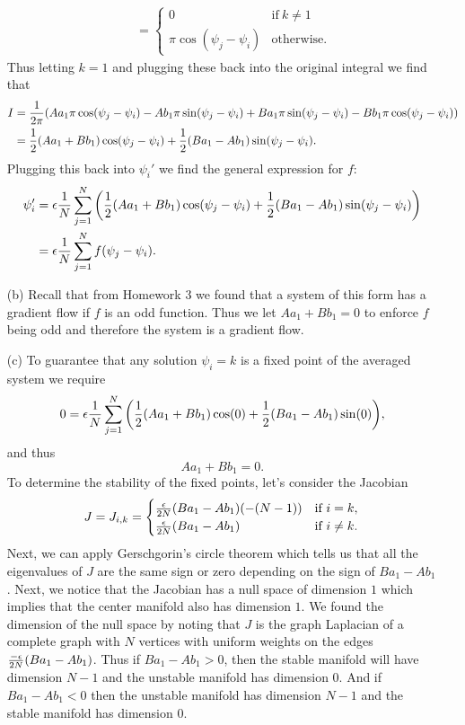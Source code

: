 \documentclass[12pt]{report}
\begin{document}
\begin{solution}
\begin{enumerate}
\begin{align*}
            &\quad = \begin{cases}
                0 & \text{if}~k\neq1\\
                \pi \cos(\psi_j - \psi_i) &\text{otherwise.}
            \end{cases}
        \end{align*}
        Thus letting $k=1$ and plugging these back into the original integral we find that
        \begin{align*}
            I &= \frac{1}{2\pi}{\left(Aa_1 \pi \cos(\psi_j - \psi_i) - Ab_1\pi \sin(\psi_j - \psi_i) + Ba_1\pi\sin(\psi_j - \psi_i) - Bb_1\pi \cos(\psi_j - \psi_i)\right)}\\
            &= \frac{1}{2}{\left(Aa_1 + Bb_1\right)}\cos(\psi_j - \psi_i) + \frac{1}{2}{\left(Ba_1 - Ab_1\right)}\sin(\psi_j - \psi_i).
        \end{align*}
        Plugging this back into $\psi_i'$ we find the general expression for $f$:
        \begin{align*}
            \psi_i' &= {\epsilon} \frac{1}{N}\sum_{j=1}^{N}{\left(\frac{1}{2}(Aa_1 + Bb_1)\cos(\psi_j - \psi_i) + \frac{1}{2}{\left(Ba_1 - Ab_1\right)}\sin(\psi_j - \psi_i)\right)}\\
            &= {\epsilon} \frac{1}{N}\sum_{j=1}^{N}f(\psi_j - \psi_i).
        \end{align*}


        \item [(b)]
        Recall that from Homework 3 we found that a system of this form has a gradient flow if $f$ is an odd function. Thus we let $Aa_1 + Bb_1 = 0$ to enforce $f$ being odd and therefore the system is a gradient flow.
        
        
        \item [(c)]
        To guarantee that any solution $\psi_i = k$ is a fixed point of the averaged system we require
        \[
            0 ={\epsilon} \frac{1}{N}\sum_{j=1}^{N}{\left(\frac{1}{2}(Aa_1 + Bb_1)\cos(0) + \frac{1}{2}{\left(Ba_1 - Ab_1\right)}\sin(0)\right)},
        \]
        and thus
        \[
            Aa_1 + Bb_1 = 0.
        \]
        To determine the stability of the fixed points, let's consider the Jacobian
        \[
            J = J_{i,k} = \begin{cases}
               \frac{{\epsilon}}{2N}(Ba_1 - Ab_1)(-(N-1)) &\text{if}~ i = k,\\
               \frac{{\epsilon}}{2N}(Ba_1 - Ab_1) &\text{if}~ i \neq k.
            \end{cases}
        \]
        Next, we can apply Gerschgorin's circle theorem which tells us that all the eigenvalues of $J$ are the same sign or zero depending on the sign of $Ba_1 - Ab_1$. Next, we notice that the Jacobian has a null space of dimension $1$ which implies that the center manifold also has dimension $1$. We found the dimension of the null space by noting that $J$ is the graph Laplacian of a complete graph with $N$ vertices with uniform weights on the edges $\frac{-{\epsilon}}{2N}(Ba_1 - Ab_1)$. Thus if $Ba_1 - Ab_1 > 0$, then the stable manifold will have dimension $N-1$ and the unstable manifold has dimension $0$. And if $Ba_1 - Ab_1 < 0$ then the unstable manifold has dimension $N-1$ and the stable manifold has dimension $0$.


\end{enumerate}
\end{solution}
\end{document}
